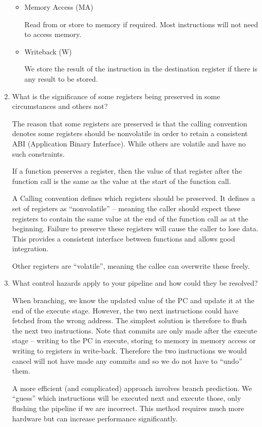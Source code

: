 \documentclass[10pt,\jkfside,a4paper]{article}
\begin{document}
\begin{enumerate}
\begin{itemize}
\item Memory Access (MA)

Read from or store to memory if required. Most instructions will not need to
access memory.

\item Writeback (W)

We store the result of the instruction in the destination register if there
is any result to be stored.

\end{itemize}

\item What is the significance of some registers being preserved in some
circumstances and others not?

The reason that some registers are preserved is that the calling convention
denotes some registers should be nonvolatile in order to retain a consistent
ABI (Application Binary Interface). While others are volatile and have no such
constraints.

If a function preserves a register, then the value of that register after
the function call is the same as the value at the start of the function call.

A Calling convention defines which registers should be preserved. It
defines a set of registers as ``nonvolatile'' -- meaning the caller should
expect these registers to contain the same value at the end of the function
call as at the beginning. Failure to preserve these registers will cause
the caller to lose data. This provides a consistent interface between
functions and allows good integration.

Other registers are ``volatile'', meaning the callee can overwrite these
freely.

\item What control hazards apply to your pipeline and how could they be
resolved?

When branching, we know the updated value of the PC and update it at the end
of the execute stage. However, the two next instructions could have fetched
from the wrong address. The simplest solution is therefore to flush the next
two instructions. Note that commits are only made after the execute stage --
writing to the PC in execute, storing to memory in memory access or writing
to registers in write-back. Therefore the two instructions we would cancel
will not have made any commits and so we do not have to ``undo'' them.

A more efficient (and complicated) approach involves branch prediction. We
``guess'' which instructions will be executed next and execute those, only
flushing the pipeline if we are incorrect. This method requires much more
hardware but can increase performance significantly.


\end{enumerate}
\end{document}
